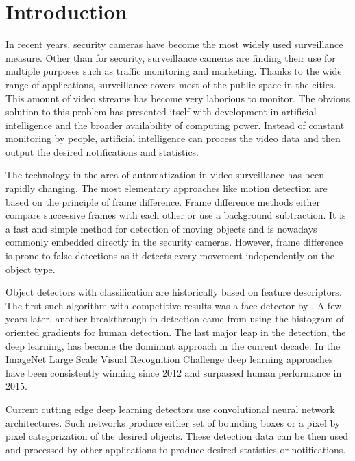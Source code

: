 \chapter*{Introduction}

In recent years, security cameras have become the most widely used surveillance measure. Other than for security, surveillance cameras are finding their use for multiple purposes such as traffic monitoring and marketing. Thanks to the wide range of applications, surveillance covers most of the public space in the cities. This amount of video streams has become very laborious to monitor. The obvious solution to this problem has presented itself with development in artificial intelligence and the broader availability of computing power. Instead of constant monitoring by people, artificial intelligence can process the video data and then output the desired notifications and statistics.

The technology in the area of automatization in video surveillance has been rapidly changing. The most elementary approaches like motion detection are based on the principle of frame difference. Frame difference methods either compare successive frames with each other or use a background subtraction. It is a fast and simple method for detection of moving objects and is nowadays commonly embedded directly in the security cameras. However, frame difference is prone to false detections as it detects every movement independently on the object type. 

Object detectors with classification are historically based on feature descriptors. The first such algorithm with competitive results was a face detector by \citeauthor{bib:viola}. A few years later, another breakthrough in detection came from \citeauthor{bib:hog} using the histogram of oriented gradients for human detection. The last major leap in the detection, the deep learning, has become the dominant approach in the current decade. In the ImageNet Large Scale Visual Recognition Challenge deep learning approaches have been consistently winning since 2012 and surpassed human performance in 2015.

Current cutting edge deep learning detectors use convolutional neural network architectures. Such networks produce either set of bounding boxes or a pixel by pixel categorization of the desired objects. These detection data can be then used and processed by other applications to produce desired statistics or notifications.

